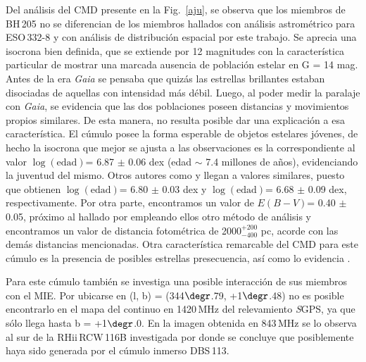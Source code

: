 \documentclass[baaa]{baaa}
\begin{document}
Del an\'alisis del CMD presente en la Fig.~\ref{aju}, se observa que los miembros de BH\,205 no se diferencian de los miembros hallados con an\'alisis astrom\'etrico para ESO\,332-8 \citep{1968se} y con an\'alisis de distribuci\'on espacial por este trabajo. Se aprecia una isocrona bien definida, que se extiende por 12 magnitudes con la caracter\'istica particular de mostrar una marcada ausencia de poblaci\'on estelar en G = 14 mag.
Antes de la era \emph{Gaia} se pensaba que quiz\'as las estrellas brillantes estaban disociadas de aquellas con intensidad m\'as d\'ebil. Luego, al poder medir la paralaje con \emph{Gaia}, se evidencia que las dos poblaciones poseen distancias y movimientos propios similares. De esta manera, no resulta posible dar una explicaci\'on a esa caracter\'istica.
El c\'umulo posee la forma esperable de objetos estelares j\'ovenes, de hecho la isocrona que mejor se ajusta a las observaciones es la correspondiente al valor $\log(\mathrm{edad})$= 6.87 $\pm$ 0.06 dex (edad $\sim$ 7.4 millones de a\~nos), evidenciando la juventud del mismo.
Otros autores como \citet{2019liu} y \citet{2021dias} llegan a valores similares, puesto que obtienen $\log(\mathrm{edad})$= 6.80 $\pm$ 0.03 dex y $\log(\mathrm{edad})$= 6.68 $\pm$ 0.09 dex, respectivamente.
Por otra parte, encontramos un valor de $E(B-V)$= 0.40 $\pm$ 0.05,  pr\'oximo al hallado por \citet{2006ahu} empleando ellos otro m\'etodo de an\'alisis y encontramos un valor de distancia fotométrica de 2000$_{-400}^{+200}$ pc, acorde con las dem\'as distancias mencionadas.
Otra caracter\'istica remarcable del CMD para este c\'umulo es la presencia de posibles estrellas presecuencia, as\'i como lo evidencia \citet{2018da}.  

Para este c\'umulo tambi\'en se investiga una posible interacci\'on de sus miembros con el MIE. Por ubicarse en (l, b) = (344$\degr$.79, +1$\degr$.48) no es posible encontrarlo en el mapa del continuo en 1420\,MHz del relevamiento {\emph SGPS}, ya que s\'olo llega hasta b = +1$\degr$.0. En la ima\-gen obtenida en 843\,MHz se lo observa al sur de la RH{\sc ii}\,RCW\,116B investigada por \citet{2020Baume} donde se concluye que posiblemente haya sido generada por el c\'umulo inmerso DBS\,113.

\end{document}
